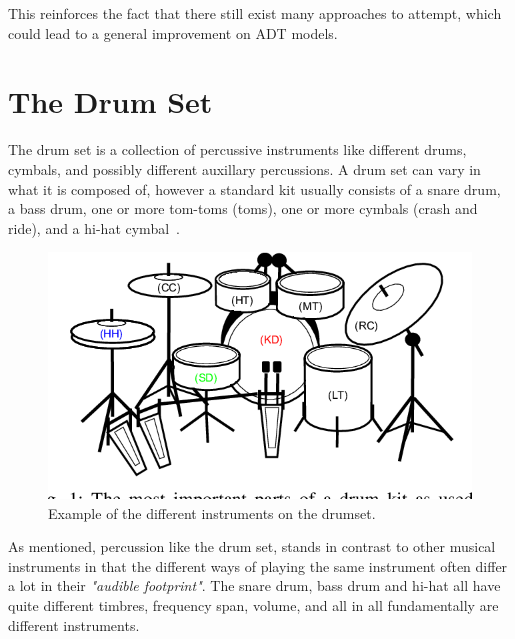 This reinforces the fact that there still exist many approaches to attempt, which could lead to a general improvement on \gls{ADT} models.

\section{The Drum Set}

The drum set is a collection of percussive instruments like different drums, cymbals, and possibly different auxillary percussions. A drum set can vary in what it is composed of, however a standard kit usually consists of a snare drum, a bass drum, one or more tom-toms (toms), one or more cymbals (crash and ride), and a hi-hat cymbal~\cite{TheDrumHandbook2003}.

\begin{figure}[H]
    \centering
    \includegraphics[scale=0.5, trim={0 1cm 0 0},clip]{figures/drumset}
    \caption{Example of the different instruments on the drumset.}
    \label{DrumsetFigure}
\end{figure}

As mentioned, percussion like the drum set, stands in contrast to other musical instruments in that the different ways of playing the same instrument often differ a lot in their \textit{"audible footprint"}. The snare drum, bass drum and hi-hat all have quite different timbres, frequency span, volume, and all in all fundamentally are different instruments.

